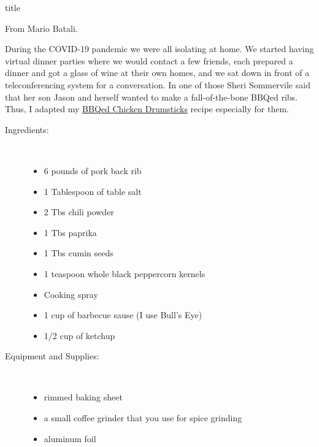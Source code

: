 \documentclass [11pt, letterpaper] {article}
\begin{document}
 {title}

\begin{flushright}
{From Mario Batali.}
\end{flushright}


During the COVID-19 pandemic we were all isolating at home. We started having virtual dinner parties where we would contact a few friends, each prepared a dinner and got a glass of wine at their own homes, and we sat down in front of a teleconferencing system for a conversation. In one of those Sheri Sommervile said that her son Jason and herself wanted to make a fall-of-the-bone BBQed ribs. Thus, I adapted my \href{BBQedChickenDrumSticks.html}{BBQed Chicken Drumsticks} recipe especially for them.

\begin{description}

\item[Ingredients:]\ \\
	\begin{itemize}
	\item 6 pounds of  pork back rib
	\item 1 Tablespoon of table salt
	\item 2 Tbs chili powder
	\item 1 Tbs paprika
	\item 1 Tbs cumin seeds
	\item 1 teaspoon whole black peppercorn kernels
	\item Cooking spray
	\item 1 cup of barbecue sause (I use Bull's Eye)
	\item 1/2 cup of ketchup
	\end{itemize}
\item[Equipment and Supplies:]\ \\
	\begin{itemize}
	\item rimmed baking sheet
	\item a small coffee grinder that you use for spice grinding
	\item aluminum foil
	\end{itemize}


\end{description}
\end{document}
